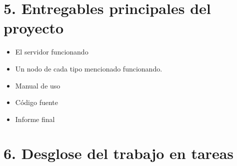 \documentclass[11pt]{charter}
\begin{document}
\section{5. Entregables principales del proyecto}
\label{sec:entregables}

\begin{itemize}
    \item El servidor funcionando
    \item Un nodo de cada tipo mencionado funcionando.
    \item Manual de uso
    \item Código fuente
    \item Informe final
\end{itemize}


\section{6. Desglose del trabajo en tareas}
\label{sec:wbs}
\end{document}
